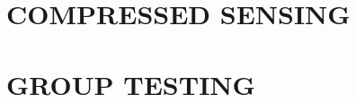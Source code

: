 \documentclass[12pt]{report}
\begin{document}
\chapter{COMPRESSED SENSING}
\label{chap:cs}


\chapter{GROUP TESTING}
\label{chap:gt}


\let\oldbibitem\bibitem
\renewcommand{\bibitem}{\setlength{\itemsep}{0pt}\oldbibitem}

{}
\renewcommand{\bibname}{{\normalsize\rm REFERENCES}}



%
\end{document}
